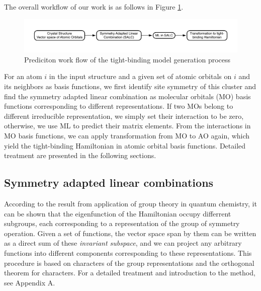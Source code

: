 \documentclass{article}
\begin{document}
The overall workflow of our work is as follows in Figure \ref{F:forward_workflow}.
\begin{figure}[h]
    \centering
    \includegraphics[width=5in]{../figures/forward_workflow.pdf}
    \caption{Prediciton work flow of the tight-binding model generation process}
    \label{F:forward_workflow}
\end{figure}
For an atom $i$ in the input structure and a given set of atomic orbitals on $i$ and its neighbors as basis functions, 
we first identify site symmetry of this cluster and find the symmetry adapted linear combination as molecular orbitals (MO) basis 
functions corresponding to different representations. If two MOs belong to different irreducible representation, we simply 
set their interaction to be zero, otherwise, we use ML to predict their matrix elements. 
From the interactions in MO basis functions, we can apply transformation from MO to AO again, which yield the tight-binding 
Hamiltonian in atomic orbital basis functions.
Detailed treatment are presented in the following sections. 

\subsection{Symmetry adapted linear combinations}
According to the result from application of group theory in quantum chemistry, it can be 
shown that the eigenfunction of the Hamiltonian occupy differrent subgroups, each 
corresponding to a representation of the group of symmetry operation. Given a set of 
functions, the vector space span by them can be written as a direct sum of these 
\emph{invariant subspace}, and we can project any arbitrary functions into different 
components corresponding to these representations. This procedure is based on characters 
of the group representations and the orthogonal theorem for characters\cite{dresselhaus_group_2008}. 
For a detailed treatment and introduction to the method, see Appendix A.
\end{document}

